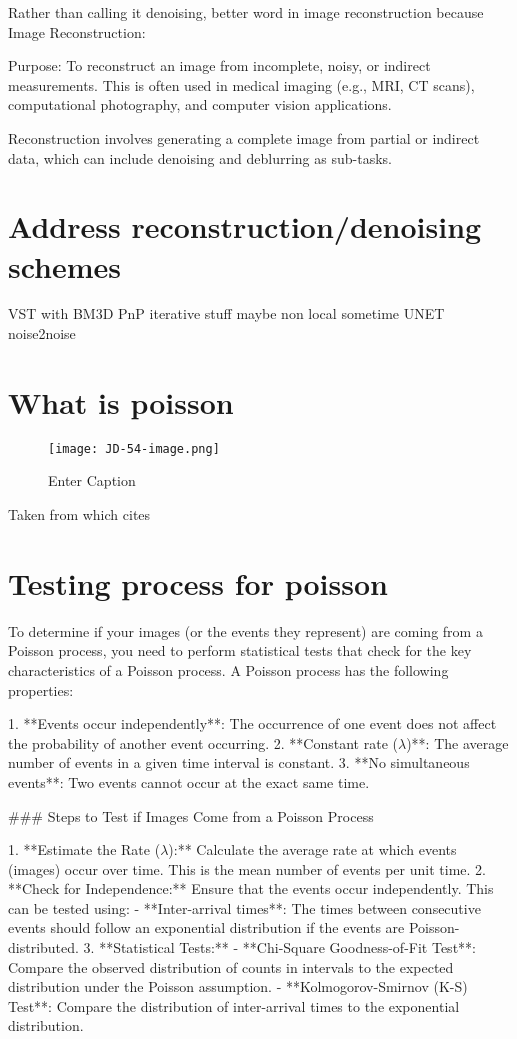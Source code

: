 Rather than calling it denoising, better word in image reconstruction because
Image Reconstruction:

Purpose: To reconstruct an image from incomplete, noisy, or indirect measurements. This is often used in medical imaging (e.g., MRI, CT scans), computational photography, and computer vision applications. 

Reconstruction involves generating a complete image from partial or indirect data, which can include denoising and deblurring as sub-tasks.

\section{Address reconstruction/denoising schemes}
VST with BM3D
PnP iterative stuff
maybe non local sometime
UNET noise2noise

\section{What is poisson}

\begin{figure}
    \centering
    \texttt{[image: JD-54-image.png]}
    \caption{Enter Caption}
    \label{fig:enter-label}
\end{figure}

Taken from \cite{Bertero2009} which cites \cite{Feller1968-mq}

\section{Testing process for poisson}
To determine if your images (or the events they represent) are coming from a Poisson process, you need to perform statistical tests that check for the key characteristics of a Poisson process. A Poisson process has the following properties:

1. **Events occur independently**: The occurrence of one event does not affect the probability of another event occurring.
2. **Constant rate ($\lambda$)**: The average number of events in a given time interval is constant.
3. **No simultaneous events**: Two events cannot occur at the exact same time.

### Steps to Test if Images Come from a Poisson Process

1. **Estimate the Rate ($\lambda$):**
Calculate the average rate at which events (images) occur over time. This is the mean number of events per unit time.
2. **Check for Independence:**
Ensure that the events occur independently. This can be tested using:
    - **Inter-arrival times**: The times between consecutive events should follow an exponential distribution if the events are Poisson-distributed.
3. **Statistical Tests:**
    - **Chi-Square Goodness-of-Fit Test**: Compare the observed distribution of counts in intervals to the expected distribution under the Poisson assumption.
    - **Kolmogorov-Smirnov (K-S) Test**: Compare the distribution of inter-arrival times to the exponential distribution.


